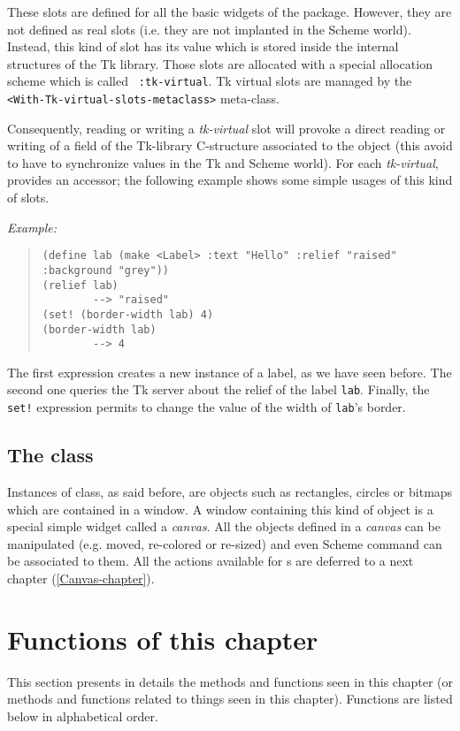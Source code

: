 These slots are defined for all the basic widgets of the {\stklos}
package. However, they are not defined as real {\stklos} slots (i.e. they are not
implanted in the Scheme world). Instead, this kind of slot has its value which
is stored inside the internal structures of the Tk library. Those slots are
allocated with a special allocation scheme which is called {\tt
:tk-virtual}. Tk virtual slots are managed by the {\tt
<With-Tk-virtual-slots-metaclass>} meta-class.

Consequently, reading or writing a {\em tk-virtual} slot will provoke a direct
reading or writing of a field of the Tk-library C-structure associated to the
object (this avoid to have to synchronize values in the Tk and Scheme
world). For each {\em tk-virtual}, {\stklos} provides an accessor; the
following example shows some simple usages of this kind of slots.

\noindent
{\em Example:}
\begin{quote}
\begin{verbatim}
(define lab (make <Label> :text "Hello" :relief "raised" :background "grey"))
(relief lab)
        --> "raised"
(set! (border-width lab) 4)
(border-width lab)
        --> 4
\end{verbatim}
\end{quote}
\noindent
The first expression creates a new instance of a label, as we have seen before. The
second one queries the Tk server about the relief of the label {\tt lab}.
Finally, the {\tt set!} expression permits to change the value of the
width of {\tt lab}'s border.

\subsection{The {\tt <Tk-canvas-item>} class}

Instances of {\tt <Tk-canvas-item>} class, as said before, are objects such as
rectangles, circles or bitmaps which are contained in a window. A window
containing this kind of object is a special simple widget called a {\em
canvas}. All the objects defined in a {\em canvas} can be manipulated
(e.g. moved, re-colored or re-sized) and even Scheme command can be associated
to them.  All the actions available for {\tt <Tk-canvas-item>}s 
are deferred to a next chapter (\ref{Canvas-chapter}).

\section{Functions of this chapter}
This section presents in details the methods and functions seen in this
chapter (or methods and functions related to things seen in this chapter).
Functions are listed below in alphabetical order.

